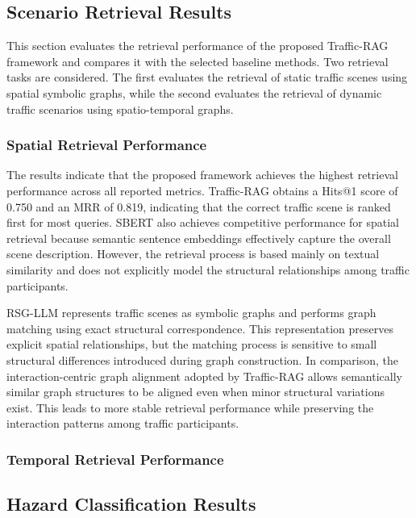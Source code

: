 \documentclass[a4paper, 11pt]{article} %
\begin{document}
\subsection{Scenario Retrieval Results}

This section evaluates the retrieval performance of the proposed Traffic-RAG framework and compares it with the selected baseline methods. Two retrieval tasks are considered. The first evaluates the retrieval of static traffic scenes using spatial symbolic graphs, while the second evaluates the retrieval of dynamic traffic scenarios using spatio-temporal graphs.
\subsubsection{Spatial Retrieval Performance}



The results indicate that the proposed framework achieves the highest retrieval performance across all reported metrics. Traffic-RAG obtains a Hits@1 score of 0.750 and an MRR of 0.819, indicating that the correct traffic scene is ranked first for most queries. SBERT also achieves competitive performance for spatial retrieval because semantic sentence embeddings effectively capture the overall scene description. However, the retrieval process is based mainly on textual similarity and does not explicitly model the structural relationships among traffic participants.

RSG-LLM represents traffic scenes as symbolic graphs and performs graph matching using exact structural correspondence. This representation preserves explicit spatial relationships, but the matching process is sensitive to small structural differences introduced during graph construction. In comparison, the interaction-centric graph alignment adopted by Traffic-RAG allows semantically similar graph structures to be aligned even when minor structural variations exist. This leads to more stable retrieval performance while preserving the interaction patterns among traffic participants.


\subsubsection{Temporal Retrieval Performance}

\subsection{Hazard Classification Results}
\end{document}

